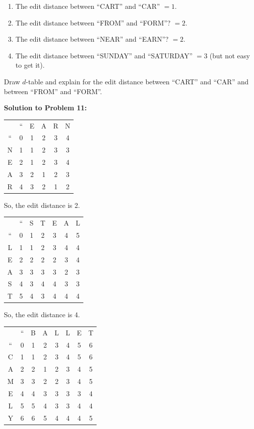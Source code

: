 \documentclass[a4paper, 12pt]{article}
\begin{document}
\begin{enumerate}
\item The edit distance between ``CART'' and ``CAR'' $= 1$.
\item The edit distance between ``FROM'' and ``FORM''? $= 2$.
\item The edit distance between ``NEAR'' and ``EARN''? $= 2$.
\item The edit distance between ``SUNDAY'' and ``SATURDAY'' $= 3$ (but not easy to get it).
\end{enumerate}

Draw $d$-table and explain for the edit distance between ``CART'' and ``CAR'' and
between  ``FROM'' and ``FORM''.

\textbf{Solution to Problem 11:}

\begin{tabular}{cccccc}
 & `` & E & A & R & N\\
 `` & 0 & 1 & 2 & 3 & 4\\
N & 1 & 1 & 2 & 3 & 3\\
E & 2 & 1 & 2 & 3 & 4\\
A & 3 & 2 & 1 & 2 & 3\\
R & 4 & 3 & 2 & 1 & 2
\end{tabular}

So, the edit distance is 2.

\bigskip

\begin{tabular}{ccccccc}
 & `` & S & T & E & A & L\\
 `` & 0 & 1 & 2 & 3 & 4 & 5\\
L & 1 & 1 & 2 & 3 & 4 & 4\\
E & 2 & 2 & 2 & 2 & 3 & 4\\
A & 3 & 3 & 3 & 3 & 2 & 3\\
S & 4 & 3 & 4 & 4 & 3 & 3\\
T & 5 & 4 & 3 & 4 & 4 & 4
\end{tabular}

So, the edit distance is 4.

\bigskip

\begin{tabular}{cccccccc}
 & `` & B & A & L & L & E & T\\
 `` & 0 & 1 & 2 & 3 & 4 & 5 & 6\\
C & 1 & 1 & 2 & 3 & 4 & 5 & 6\\
A & 2 & 2 & 1 & 2 & 3 & 4 & 5\\
M & 3 & 3 & 2 & 2 & 3 & 4 & 5\\
E & 4 & 4 & 3 & 3 & 3 & 3 & 4\\
L & 5 & 5 & 4 & 3 & 3 & 4 & 4\\
Y & 6 & 6 & 5 & 4 & 4 & 4 & 5
\end{tabular}
\end{document}
